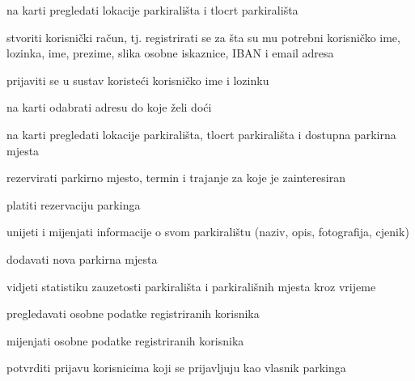			
			\begin{packed_enum}
				\item  {}
				
				\begin{packed_enum}
					\item na karti pregledati lokacije parkirališta i tlocrt parkirališta
					\item stvoriti korisnički račun, tj. registrirati se za šta su mu potrebni korisničko ime, lozinka,  ime, prezime, slika osobne iskaznice, IBAN i email adresa 
				\end{packed_enum}
			
				\item  {}
				
				\begin{packed_enum}
					\item prijaviti se u sustav koristeći korisničko ime i lozinku
					\item na karti odabrati adresu do koje želi doći
					\item na karti pregledati lokacije parkirališta, tlocrt parkirališta i dostupna parkirna mjesta
					\item rezervirati parkirno mjesto, termin i trajanje za koje je zainteresiran
					\item platiti rezervaciju parkinga 
				\end{packed_enum}
				
				\item  {}
				
				\begin{packed_enum}
					\item unijeti i mijenjati informacije o svom parkiralištu (naziv, opis, fotografija, cjenik)
					\item dodavati nova parkirna mjesta
					\item vidjeti statistiku zauzetosti parkirališta i parkirališnih mjesta kroz vrijeme
			 	\end{packed_enum}
			 	
				\item  {}
				
				\begin{packed_enum}
					\item pregledavati osobne podatke registriranih korisnika
					\item mijenjati osobne podatke registriranih korisnika
					\item potvrditi prijavu korisnicima koji se prijavljuju kao vlasnik parkinga
					
				\end{packed_enum}
			\end{packed_enum}
			\eject 
			
